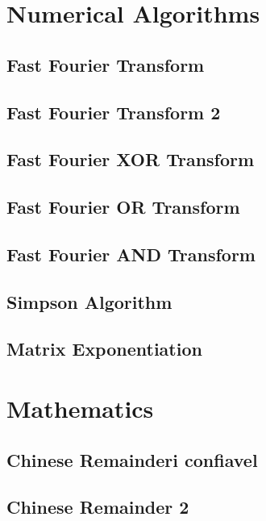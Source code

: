 \section{Numerical Algorithms}
\subsection{Fast Fourier Transform}
\raggedbottom
\hrulefill
\subsection{Fast Fourier Transform 2}
\raggedbottom
\hrulefill
\subsection{Fast Fourier XOR Transform}
\raggedbottom
\hrulefill
\subsection{Fast Fourier OR Transform}
\raggedbottom
\hrulefill
\subsection{Fast Fourier AND Transform}
\raggedbottom
\hrulefill
\subsection{Simpson Algorithm}
\raggedbottom
\hrulefill
\subsection{Matrix Exponentiation}
\raggedbottom
\hrulefill

\section{Mathematics}
\subsection{Chinese Remainderi confiavel}
\raggedbottom
\hrulefill
\subsection{Chinese Remainder 2}
\raggedbottom
\hrulefill
